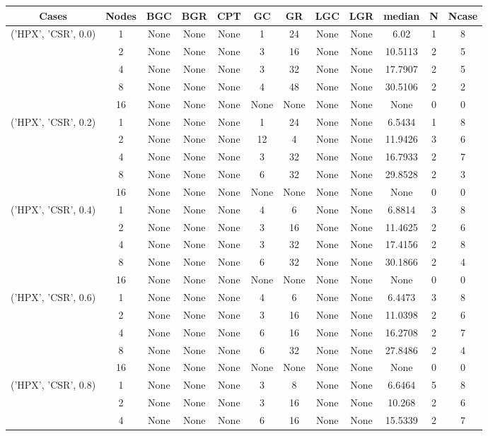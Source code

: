 \begin{tabular}{cccccccccccc}
\hline
Cases & Nodes& BGC& BGR& CPT& GC& GR& LGC& LGR& median & N & Ncase \\
\hline
\multirow{5}{*}{('HPX', 'CSR', 0.0)}& 1& None& None& None& 1& 24& None& None& 6.02& 1& 8\\
& 2& None& None& None& 3& 16& None& None& 10.5113& 2& 5\\
& 4& None& None& None& 3& 32& None& None& 17.7907& 2& 5\\
& 8& None& None& None& 4& 48& None& None& 30.5106& 2& 2\\
& 16& None& None& None& None& None& None& None& None& 0& 0\\
\hline
\multirow{5}{*}{('HPX', 'CSR', 0.2)}& 1& None& None& None& 1& 24& None& None& 6.5434& 1& 8\\
& 2& None& None& None& 12& 4& None& None& 11.9426& 3& 6\\
& 4& None& None& None& 3& 32& None& None& 16.7933& 2& 7\\
& 8& None& None& None& 6& 32& None& None& 29.8528& 2& 3\\
& 16& None& None& None& None& None& None& None& None& 0& 0\\
\hline
\multirow{5}{*}{('HPX', 'CSR', 0.4)}& 1& None& None& None& 4& 6& None& None& 6.8814& 3& 8\\
& 2& None& None& None& 3& 16& None& None& 11.4625& 2& 6\\
& 4& None& None& None& 3& 32& None& None& 17.4156& 2& 8\\
& 8& None& None& None& 6& 32& None& None& 30.1866& 2& 4\\
& 16& None& None& None& None& None& None& None& None& 0& 0\\
\hline
\multirow{5}{*}{('HPX', 'CSR', 0.6)}& 1& None& None& None& 4& 6& None& None& 6.4473& 3& 8\\
& 2& None& None& None& 3& 16& None& None& 11.0398& 2& 6\\
& 4& None& None& None& 6& 16& None& None& 16.2708& 2& 7\\
& 8& None& None& None& 6& 32& None& None& 27.8486& 2& 4\\
& 16& None& None& None& None& None& None& None& None& 0& 0\\
\hline
\multirow{5}{*}{('HPX', 'CSR', 0.8)}& 1& None& None& None& 3& 8& None& None& 6.6464& 5& 8\\
& 2& None& None& None& 3& 16& None& None& 10.268& 2& 6\\
& 4& None& None& None& 6& 16& None& None& 15.5339& 2& 7\\

\end{tabular}
